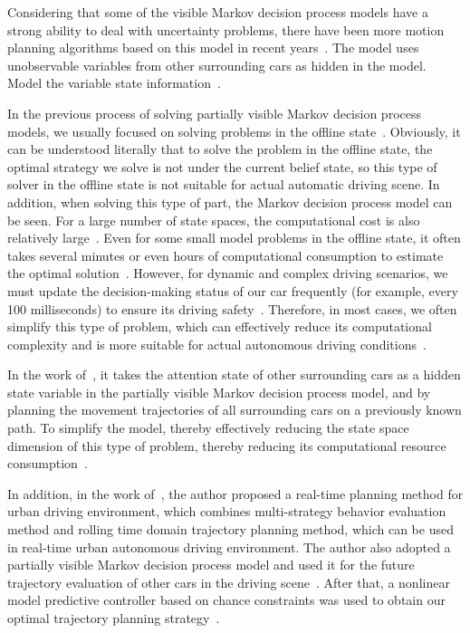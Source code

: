 \documentclass[conference]{IEEEtran}
\begin{document}
Considering that some of the visible Markov decision process models have a strong ability to deal with uncertainty problems, there have been more motion planning algorithms based on this model in recent years~\cite{self_driving}. The model uses unobservable variables from other surrounding cars as hidden in the model. Model the variable state information~\cite{Brian2016}.

In the previous process of solving partially visible Markov decision process models, we usually focused on solving problems in the offline state~\cite{gonzalez2015review}. Obviously, it can be understood literally that to solve the problem in the offline state, the optimal strategy we solve is not under the current belief state, so this type of solver in the offline state is not suitable for actual automatic driving scene. In addition, when solving this type of part, the Markov decision process model can be seen. For a large number of state spaces, the computational cost is also relatively large~\cite{gonzalez2015review}. Even for some small model problems in the offline state, it often takes several minutes or even hours of computational consumption to estimate the optimal solution~\cite{gonzalez2015review}. However, for dynamic and complex driving scenarios, we must update the decision-making status of our car frequently (for example, every 100 milliseconds) to ensure its driving safety~\cite{gonzalez2015review}. Therefore, in most cases, we often simplify this type of problem, which can effectively reduce its computational complexity and is more suitable for actual autonomous driving conditions~\cite{gonzalez2015review}.

In the work of~\cite{hubmann2017decision}, it takes the attention state of other surrounding cars as a hidden state variable in the partially visible Markov decision process model, and by planning the movement trajectories of all surrounding cars on a previously known path. To simplify the model, thereby effectively reducing the state space dimension of this type of problem, thereby reducing its computational resource consumption~\cite{hubmann2017decision}.

In addition, in the work of~\cite{hubmann2017decision}, the author proposed a real-time planning method for urban driving environment, which combines multi-strategy behavior evaluation method and rolling time domain trajectory planning method, which can be used in real-time urban autonomous driving environment. The author also adopted a partially visible Markov decision process model and used it for the future trajectory evaluation of other cars in the driving scene~\cite{hubmann2017decision}. After that, a nonlinear model predictive controller based on chance constraints was used to obtain our optimal trajectory planning strategy~\cite{hubmann2017decision}.
\end{document}

